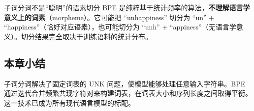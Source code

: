 \begin{warningbox}{子词分词不是``聪明''的语素切分}
BPE 是纯粹基于统计频率的算法，\textbf{不理解语言学意义上的词素}（morpheme）。它可能把 ``unhappiness'' 切分为 ``un'' + ``happiness''（恰好对应语素），也可能切分为 ``unh'' + ``appiness''（无语言学意义）。切分结果完全取决于训练语料的统计分布。
\end{warningbox}

\subsection{本章小结}

子词分词解决了固定词表的 UNK 问题，使模型能够处理任意输入字符串。BPE 通过迭代合并频繁共现字符对来构建词表，在词表大小和序列长度之间取得平衡。这一技术已成为所有现代语言模型的标配。


